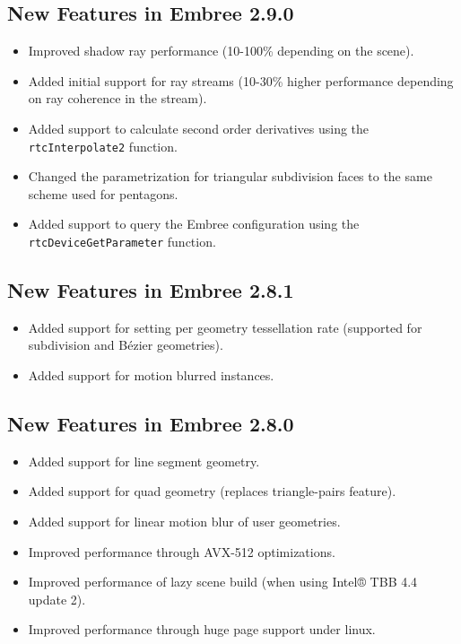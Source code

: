 \subsection{New Features in Embree
2.9.0}\label{new-features-in-embree-2.9.0}

\begin{itemize}
\tightlist
\item
  Improved shadow ray performance (10-100\% depending on the scene).
\item
  Added initial support for ray streams (10-30\% higher performance
  depending on ray coherence in the stream).
\item
  Added support to calculate second order derivatives using the
  \texttt{rtcInterpolate2} function.
\item
  Changed the parametrization for triangular subdivision faces to the
  same scheme used for pentagons.
\item
  Added support to query the Embree configuration using the
  \texttt{rtcDeviceGetParameter} function.
\end{itemize}

\subsection{New Features in Embree
2.8.1}\label{new-features-in-embree-2.8.1}

\begin{itemize}
\tightlist
\item
  Added support for setting per geometry tessellation rate (supported
  for subdivision and Bézier geometries).
\item
  Added support for motion blurred instances.
\end{itemize}

\subsection{New Features in Embree
2.8.0}\label{new-features-in-embree-2.8.0}

\begin{itemize}
\tightlist
\item
  Added support for line segment geometry.
\item
  Added support for quad geometry (replaces triangle-pairs feature).
\item
  Added support for linear motion blur of user geometries.
\item
  Improved performance through AVX-512 optimizations.
\item
  Improved performance of lazy scene build (when using Intel® TBB 4.4
  update 2).
\item
  Improved performance through huge page support under linux.
\end{itemize}

